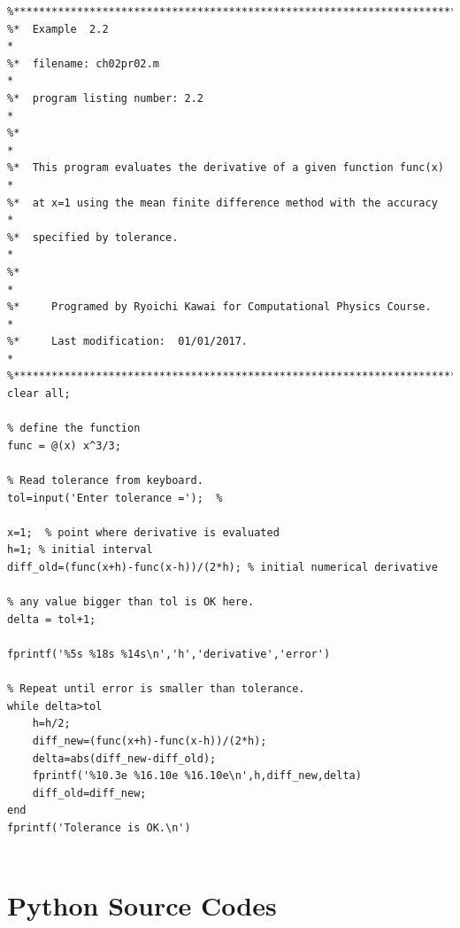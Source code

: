 
\bigskip\noindent
\program
\label{prog:derivative-auto}

\footnotesize
\begin{verbatim}
%**************************************************************************
%*  Example  2.2                                                          *
%*  filename: ch02pr02.m                                                  *
%*  program listing number: 2.2                                           *
%*                                                                        *
%*  This program evaluates the derivative of a given function func(x)     *
%*  at x=1 using the mean finite difference method with the accuracy      *
%*  specified by tolerance.                                               *
%*                                                                        *
%*     Programed by Ryoichi Kawai for Computational Physics Course.       *
%*     Last modification:  01/01/2017.                                    *
%**************************************************************************
clear all;

% define the function
func = @(x) x^3/3;

% Read tolerance from keyboard.
tol=input('Enter tolerance =');  % 

x=1;  % point where derivative is evaluated
h=1; % initial interval
diff_old=(func(x+h)-func(x-h))/(2*h); % initial numerical derivative

% any value bigger than tol is OK here.
delta = tol+1;

fprintf('%5s %18s %14s\n','h','derivative','error')

% Repeat until error is smaller than tolerance.
while delta>tol
    h=h/2;
    diff_new=(func(x+h)-func(x-h))/(2*h);
    delta=abs(diff_new-diff_old);
    fprintf('%10.3e %16.10e %16.10e\n',h,diff_new,delta)
    diff_old=diff_new;
end
fprintf('Tolerance is OK.\n')


\end{verbatim}
\normalsize


\bigskip
\noindent
\section*{Python Source Codes}
\setcounter{program}{0}

\bigskip
\noindent
\program

